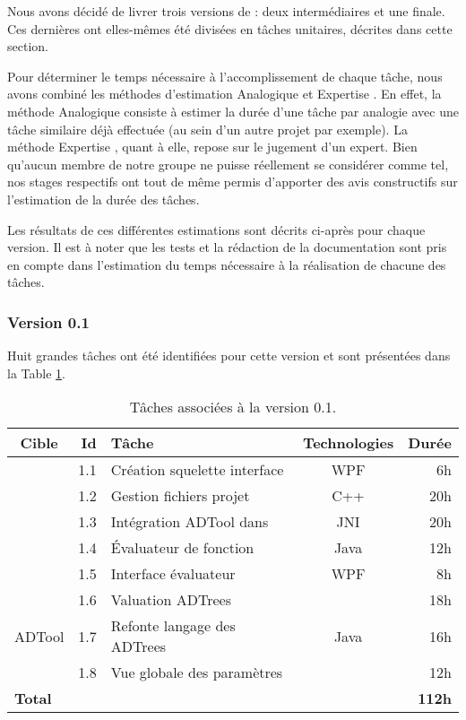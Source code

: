 	Nous avons décidé de livrer trois versions de \glasir{} : deux intermédiaires et une finale. Ces dernières ont elles-mêmes été divisées en tâches unitaires, décrites dans cette section.
	
	Pour déterminer le temps nécessaire à l'accomplissement de chaque tâche, nous avons combiné les méthodes d’estimation \og Analogique \fg{} et \og Expertise \fg{}. En effet, la méthode \og Analogique \fg{} consiste à estimer la durée d'une tâche par analogie avec une tâche similaire déjà effectuée (au sein d'un autre projet par exemple). La méthode \og Expertise \fg{}, quant à elle, repose sur le jugement d'un expert. Bien qu'aucun membre de notre groupe ne puisse réellement se considérer comme tel, nos stages respectifs ont tout de même permis d'apporter des avis constructifs sur l'estimation de la durée des tâches.
	
	Les résultats de ces différentes estimations sont décrits ci-après pour chaque version. Il est à noter que les tests et la rédaction de la documentation sont pris en compte dans l'estimation du temps nécessaire à la réalisation de chacune des tâches.
	

		\subsubsection{Version 0.1}
			Huit grandes tâches ont été identifiées pour cette version et sont présentées dans la {\sc Table} \ref{tab:taches_units_1}. 
			\begin{table}[H]
				\centering
				\begin{tabular}{|c|r|l|c|r|}
					\hline
					\textbf{Cible} & \textbf{Id} & \textbf{Tâche} & \textbf{Technologies} & \textbf{Durée}\\
					\hline

					\multirow{5}{*}{\glasir{}} & 1.1 & Création squelette interface & WPF & 6h\\
					\cline{2-5}
					 & 1.2 & Gestion fichiers projet & C++ & 20h\\
					\cline{2-5}
					 & 1.3 & Intégration ADTool dans \glasir & JNI & 20h\\
					\cline{2-5}
					 & 1.4 & \'Evaluateur de fonction & Java & 12h\\
					\cline{2-5}
					 & 1.5 & Interface évaluateur & WPF & 8h\\
					\hline

					\multirow{3}{*}{ADTool} & 1.6 & Valuation ADTrees & \multirow{3}{*}{Java} & 18h\\
					\cline{2-3} \cline{5-5}
					 & 1.7 & Refonte langage des ADTrees & & 16h\\
					\cline{2-3} \cline{5-5}
					 & 1.8 & Vue globale des paramètres & & 12h\\
					\hline

					\multicolumn{4}{|l|}{\bf Total} & {\bf 112h}\\
					\hline
				\end{tabular}
				\caption{Tâches associées à la version 0.1.}
				\label{tab:taches_units_1}
			\end{table}
			
